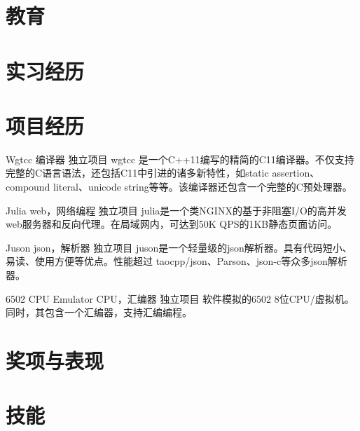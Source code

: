\documentclass[11pt,a4paper]{moderncv}
\title{}               %
\begin{document}
\maketitle

\section{教育}

\section{实习经历}

\section{项目经历}
\renewcommand{\baselinestretch}{1.2}

{Wgtcc}
{编译器}
{独立项目}{}
{wgtcc 是一个C++11编写的精简的C11编译器。不仅支持完整的C语言语法，还包括C11中引进的诸多新特性，如static assertion、compound literal、unicode string等等。该编译器还包含一个完整的C预处理器。}

\vspace*{0.2\baselineskip}
{Julia}
{web，网络编程}
{独立项目}{}
{julia是一个类NGINX的基于非阻塞I/O的高并发web服务器和反向代理。在局域网内，可达到50K QPS的1KB静态页面访问。}

\vspace*{0.2\baselineskip}
{Juson}
{json，解析器}
{独立项目}{}
{juson是一个轻量级的json解析器。具有代码短小、易读、使用方便等优点。性能超过 taocpp/json、Parson、json-c等众多json解析器。}

\vspace*{0.2\baselineskip}
{6502 CPU Emulator}
{CPU，汇编器}
{独立项目}{}
{软件模拟的6502 8位CPU/虚拟机。同时，其包含一个汇编器，支持汇编编程。}

\renewcommand{\baselinestretch}{1.0}

\section{奖项与表现}


\section{技能}

\closesection{}                   %
\renewcommand{\listitemsymbol}{-} %
\end{document}
